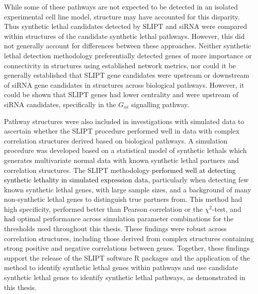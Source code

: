 While some of these pathways are not expected to be detected in an isolated experimental cell line model,  structure may have accounted for this disparity. Thus \gls{synthetic lethal} candidates detected by \gls{SLIPT} and \gls{siRNA} were compared within  structures of the candidate \gls{synthetic lethal} pathways. However, this did not generally account for differences between these approaches. Neither \gls{synthetic lethal} detection methodology preferentially detected genes of more importance or connectivity in  structures using established network metrics, nor could it be generally established that \gls{SLIPT} gene candidates were upstream or downstream of \gls{siRNA} gene candidates in  structures across biological pathways. However, it could be shown that \gls{SLIPT} genes had lower centrality and were upstream of \gls{siRNA} candidates, specifically in the $G_{\alpha i}$ signalling pathway.

Pathway  structures were also included in investigations with simulated data to ascertain whether the \gls{SLIPT} procedure performed well in data with complex correlation structures derived based on biological pathways. A simulation procedure was developed based on a statistical model of \glspl{synthetic lethal} which generates multivariate normal data with known \gls{synthetic lethal} partners and correlation structures. The \gls{SLIPT} methodology \textcolor{black}{performed well at detecting synthetic lethality in simulated expression data}, particularly when detecting few known \gls{synthetic lethal} genes, with large sample sizes, and a background of many non-synthetic lethal genes to distinguish true partners from. This method had high specificity, performed better than Pearson correlation or the $\chi^2$-test, and \textcolor{black}{had} optimal performance across simulation parameter combinations for the thresholds used throughout this thesis. These findings were robust across correlation structures, including those derived from complex  structures containing strong positive and negative correlations between genes. 
Together, these findings support the release of the \gls{SLIPT} software R packages and the application of the method to identify \gls{synthetic lethal} genes within pathways and use candidate \gls{synthetic lethal} genes to identify \gls{synthetic lethal} pathways, as demonstrated in this thesis.



